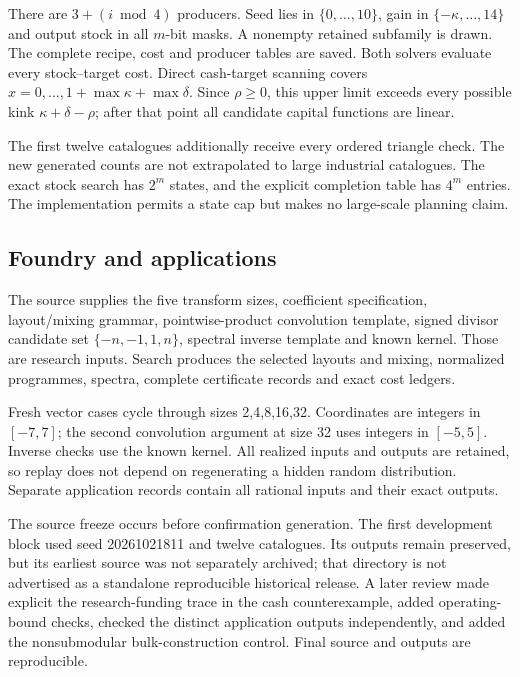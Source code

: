 \documentclass[11pt,letterpaper]{article}
\theoremstyle{definition}\newtheorem{definition}[theorem]{Definition}
\theoremstyle{remark}\newtheorem{remark}[theorem]{Remark}
\begin{document}
There are $3+(i\bmod4)$ producers. Seed lies in $\{0,\ldots,10\}$, gain in $\{-\kappa,\ldots,14\}$ and output stock in all $m$-bit masks. A nonempty retained subfamily is drawn. The complete recipe, cost and producer tables are saved. Both solvers evaluate every stock--target cost. Direct cash-target scanning covers $x=0,\ldots,1+\max\kappa+\max\delta$. Since $\rho\ge0$, this upper limit exceeds every possible kink $\kappa+\delta-\rho$; after that point all candidate capital functions are linear.

The first twelve catalogues additionally receive every ordered triangle check. The new generated counts are not extrapolated to large industrial catalogues. The exact stock search has $2^m$ states, and the explicit completion table has $4^m$ entries. The implementation permits a state cap but makes no large-scale planning claim.

\subsection{Foundry and applications}
The source supplies the five transform sizes, coefficient specification, layout/mixing grammar, pointwise-product convolution template, signed divisor candidate set $\{-n,-1,1,n\}$, spectral inverse template and known kernel. Those are research inputs. Search produces the selected layouts and mixing, normalized programmes, spectra, complete certificate records and exact cost ledgers.

Fresh vector cases cycle through sizes 2,4,8,16,32. Coordinates are integers in $[-7,7]$; the second convolution argument at size 32 uses integers in $[-5,5]$. Inverse checks use the known kernel. All realized inputs and outputs are retained, so replay does not depend on regenerating a hidden random distribution. Separate application records contain all rational inputs and their exact outputs.

The source freeze occurs before confirmation generation. The first development block used seed 20261021811 and twelve catalogues. Its outputs remain preserved, but its earliest source was not separately archived; that directory is not advertised as a standalone reproducible historical release. A later review made explicit the research-funding trace in the cash counterexample, added operating-bound checks, checked the distinct application outputs independently, and added the nonsubmodular bulk-construction control. Final source and outputs are reproducible.
\end{document}
